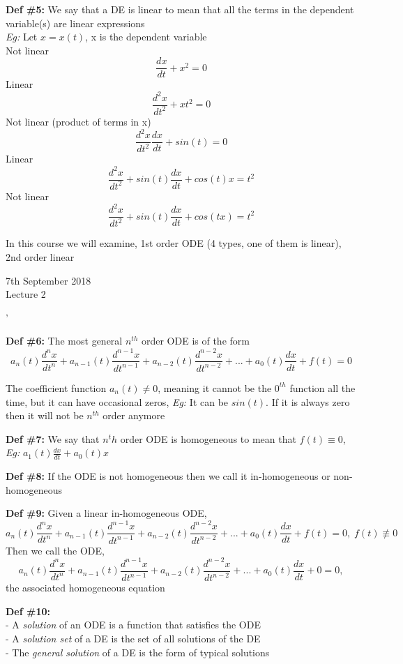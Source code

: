 \documentclass[11pt]{article}
\theoremstyle{definition}
\begin{document}
\textbf{Def \#5:} We say that a DE is linear to mean that all the terms in the dependent variable(s) are linear expressions\\
\textit{Eg:} Let $x = x(t)$, x is the dependent variable\\
Not linear
$$\frac{dx}{dt} + x^2 = 0$$
Linear
$$\frac{d^2x}{dt^2} + xt^2 = 0$$
Not linear (product of terms in x)
$$\frac{d^2x}{dt^2}\frac{dx}{dt} + sin(t) = 0$$
Linear
$$\frac{d^2x}{dt^2}+ sin(t)\frac{dx}{dt} + cos(t)x = t^2$$
Not linear
$$\frac{d^2x}{dt^2}+ sin(t)\frac{dx}{dt} + cos(tx) = t^2$$

In this course we will examine, 1st order ODE (4 types, one of them is linear), 2nd order linear
\newpage
\begin{center}
    {\LARGE 7th September 2018 \\ Lecture 2}
\end{center}'

\textbf{Def \#6:} The most general $n^{th}$ order ODE is of the form
$$a_n(t)\frac{d^nx}{dt^n} + a_{n-1}(t)\frac{d^{n-1}x}{dt^{n-1}} + a_{n-2}(t)\frac{d^{n-2}x}{dt^{n-2}} + ... + a_0(t)\frac{dx}{dt} + f(t) = 0$$

The coefficient function $a_n(t) \neq 0$, meaning it cannot be the $0^{th}$ function all the time, but it can have occasional zeros, \textit{Eg:} It can be $sin(t)$. If it is always zero then it will not be $n^{th}$ order anymore

\textbf{Def \#7:} We say that $n^th$ order ODE is homogeneous to mean that $f(t) \equiv 0$, \textit{Eg:} $a_1(t) \frac{dx}{dt} + a_0(t)x$

\textbf{Def \#8:} If the ODE is not homogeneous then we call it in-homogeneous or non-homogeneous

\textbf{Def \#9:} Given a linear in-homogeneous ODE, $$a_n(t)\frac{d^nx}{dt^n} + a_{n-1}(t)\frac{d^{n-1}x}{dt^{n-1}} + a_{n-2}(t)\frac{d^{n-2}x}{dt^{n-2}} + ... + a_0(t)\frac{dx}{dt} + f(t) = 0, \; f(t) \not\equiv 0$$
Then we call the ODE, $$a_n(t)\frac{d^nx}{dt^n} + a_{n-1}(t)\frac{d^{n-1}x}{dt^{n-1}} + a_{n-2}(t)\frac{d^{n-2}x}{dt^{n-2}} + ... + a_0(t)\frac{dx}{dt} + 0 = 0,$$ the associated homogeneous equation

\textbf{Def \#10:}\\
- A \textit{solution} of an ODE is a function that satisfies the ODE \\
- A \textit{solution set} of a DE is the set of all solutions of the DE \\
- The \textit{general solution} of a DE is the form of typical solutions
\end{document}
